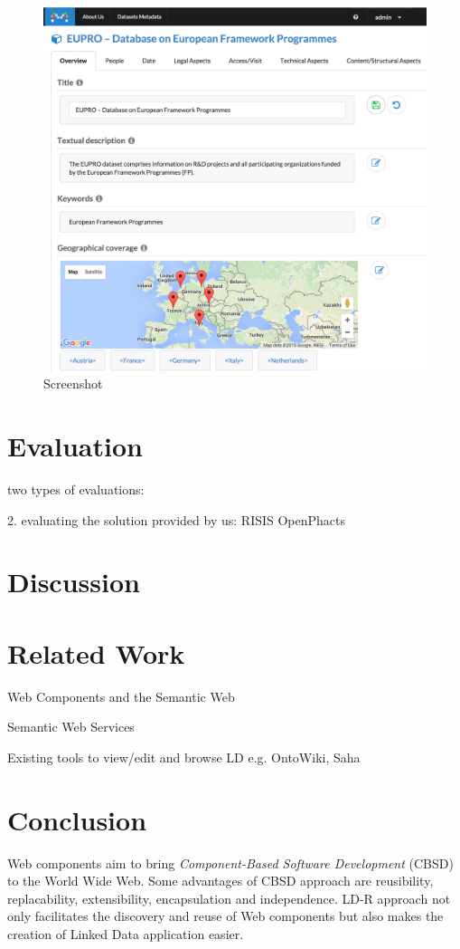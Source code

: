 \documentclass{acm_proc_article-sp}
\begin{document}
\begin{figure}[tb]
  \includegraphics[width=.9\linewidth]{images/screenshot.jpg}
  \caption{Screenshot}
\end{figure}

\section{Evaluation}

two types of evaluations:


2. evaluating the solution provided by us:
RISIS
OpenPhacts

\section{Discussion}

\section{Related Work}

Web Components and the Semantic Web~\cite{pahl2011}

Semantic Web Services

Existing tools to view/edit and browse LD e.g. OntoWiki, Saha

\section{Conclusion}
Web components aim to bring \emph{Component-Based Software Development} (CBSD) to the World Wide Web.
Some advantages of CBSD approach are reusibility, replacability, extensibility, encapsulation and independence.
LD-R approach not only facilitates the discovery and reuse of Web components but also makes the creation of Linked Data application easier.
\end{document}
